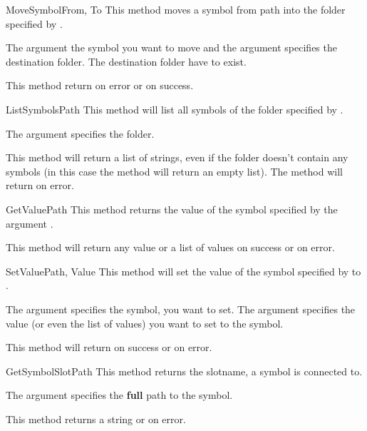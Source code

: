 \begin{methoddesc}[System]{MoveSymbol}{From, To}
This method moves a symbol from path  into the folder specified by 
.

The argument  the symbol you want to move and the argument 
 specifies the destination folder. The destination folder have to exist.

This method return  on error or  on success.
\end{methoddesc}


\begin{methoddesc}[System]{ListSymbols}{Path}
This method will list all symbols of the folder specified by .

The argument  specifies the folder.

This method will return a list of strings, even if the folder doesn't contain 
any symbols (in this case the method will return an empty list). The method
will return  on error.
\end{methoddesc}


\begin{methoddesc}[System]{GetValue}{Path}
This method returns the value of the symbol specified by the argument 
. 

This method will return any value or a list of values on success or 
 on error.
\end{methoddesc}


\begin{methoddesc}[System]{SetValue}{Path, Value}
This method will set the value of the symbol specified by  to 
.

The argument  specifies the symbol, you want to set. The argument 
 specifies the value (or even the list of values) you want to set 
to the symbol.

This method will return  on success or  on error.
\end{methoddesc}


\begin{methoddesc}[System]{GetSymbolSlot}{Path}
This method returns the slotname, a symbol is connected to. 

The argument  specifies the \textbf{full} path
to the symbol.

This method returns a string or  on error.
\end{methoddesc}


